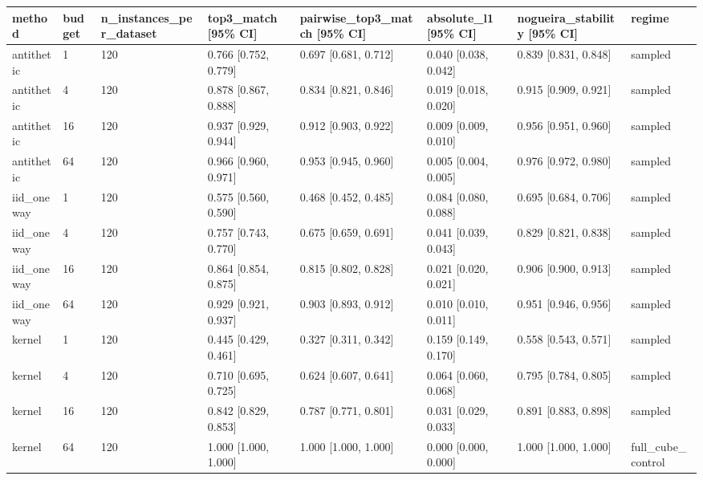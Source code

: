 \begin{tabular}{llllllll}
\toprule
method & budget & n\_instances\_per\_dataset & top3\_match [95\% CI] & pairwise\_top3\_match [95\% CI] & absolute\_l1 [95\% CI] & nogueira\_stability [95\% CI] & regime \\
\midrule
antithetic & 1 & 120 & 0.766 [0.752, 0.779] & 0.697 [0.681, 0.712] & 0.040 [0.038, 0.042] & 0.839 [0.831, 0.848] & sampled \\
antithetic & 4 & 120 & 0.878 [0.867, 0.888] & 0.834 [0.821, 0.846] & 0.019 [0.018, 0.020] & 0.915 [0.909, 0.921] & sampled \\
antithetic & 16 & 120 & 0.937 [0.929, 0.944] & 0.912 [0.903, 0.922] & 0.009 [0.009, 0.010] & 0.956 [0.951, 0.960] & sampled \\
antithetic & 64 & 120 & 0.966 [0.960, 0.971] & 0.953 [0.945, 0.960] & 0.005 [0.004, 0.005] & 0.976 [0.972, 0.980] & sampled \\
iid\_oneway & 1 & 120 & 0.575 [0.560, 0.590] & 0.468 [0.452, 0.485] & 0.084 [0.080, 0.088] & 0.695 [0.684, 0.706] & sampled \\
iid\_oneway & 4 & 120 & 0.757 [0.743, 0.770] & 0.675 [0.659, 0.691] & 0.041 [0.039, 0.043] & 0.829 [0.821, 0.838] & sampled \\
iid\_oneway & 16 & 120 & 0.864 [0.854, 0.875] & 0.815 [0.802, 0.828] & 0.021 [0.020, 0.021] & 0.906 [0.900, 0.913] & sampled \\
iid\_oneway & 64 & 120 & 0.929 [0.921, 0.937] & 0.903 [0.893, 0.912] & 0.010 [0.010, 0.011] & 0.951 [0.946, 0.956] & sampled \\
kernel & 1 & 120 & 0.445 [0.429, 0.461] & 0.327 [0.311, 0.342] & 0.159 [0.149, 0.170] & 0.558 [0.543, 0.571] & sampled \\
kernel & 4 & 120 & 0.710 [0.695, 0.725] & 0.624 [0.607, 0.641] & 0.064 [0.060, 0.068] & 0.795 [0.784, 0.805] & sampled \\
kernel & 16 & 120 & 0.842 [0.829, 0.853] & 0.787 [0.771, 0.801] & 0.031 [0.029, 0.033] & 0.891 [0.883, 0.898] & sampled \\
kernel & 64 & 120 & 1.000 [1.000, 1.000] & 1.000 [1.000, 1.000] & 0.000 [0.000, 0.000] & 1.000 [1.000, 1.000] & full\_cube\_control \\
\bottomrule
\end{tabular}
